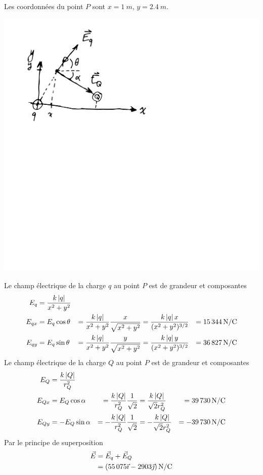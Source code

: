 \begin{reponsebox}
  Les coordonnées du point $P$ sont $x = \SI{1}{m}$, $y = \SI{2.4}{m}$.
  \begin{center}
    \includegraphics[scale=0.5]{02-champ-electrique/figures/champ-deux-charges-soln.pdf}
  \end{center}
  Le champ électrique de la charge $q$ au point $P$ est de grandeur et
  composantes
  \begin{align*}
    E_q &= \frac{k\abs{q}}{x^2 + y^2} \\
    E_{qx} &= E_q \cos \theta
        &= \frac{k\abs{q}}{x^2 + y^2} \frac{x}{\sqrt{x^2 + y^2}}
        &= \frac{k\abs{q}x}{(x^2 + y^2)^{3/2}}
        &= \SI{15344}{N/C} \\
    E_{qy} &= E_q \sin \theta
        &= \frac{k\abs{q}}{x^2 + y^2} \frac{y}{\sqrt{x^2 + y^2}}
        &= \frac{k\abs{q}y}{(x^2 + y^2)^{3/2}}
        &= \SI{36827}{N/C} \\
  \end{align*}
  Le champ électrique de la charge $Q$ au point $P$ est de grandeur et
  composantes
  \begin{align*}
    E_Q &= \frac{k\abs{Q}}{r_Q^2} \\
    E_{Qx} &= E_Q \cos \alpha
        &= \frac{k\abs{Q}}{r_Q^2} \frac{1}{\sqrt{2}}
        &= \frac{k\abs{Q}}{\sqrt{2}r_Q^2}
        &= \SI{39730}{N/C} \\
    E_{Qy} &= -E_Q \sin \alpha
        &= -\frac{k\abs{Q}}{r_Q^2} \frac{1}{\sqrt{2}}
        &= -\frac{k\abs{Q}}{\sqrt{2}r_Q^2}
        &= \SI{-39730}{N/C} \\
  \end{align*}
  Par le principe de superposition
  \begin{align*}
    \vE &= \vE_q + \vE_Q  \\
        &= \left(\num{55075}\xhat - \num{2903}\yhat\right) \si{N/C}
  \end{align*}
\end{reponsebox}


